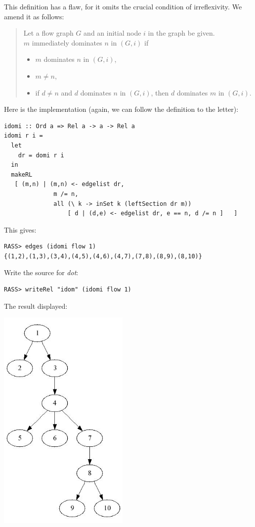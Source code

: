 \documentclass[11pt]{article}
\newlength{\fminilength}
\newenvironment{fminipage}[1][\linewidth]
 {\setlength{\fminilength}{#1-2\fboxsep-2\fboxrule-1em}%
  \bigskip\begin{lrbox}{\fminibox}\quad\begin{minipage}{\fminilength}\bigskip}
 {\smallskip\end{minipage}\end{lrbox}\noindent\fbox{\usebox{\fminibox}}\bigskip}
\newcommand{\bc}{\begin{fminipage}}
\newcommand{\ec}{\end{fminipage}}
\begin{document}
This definition has a flaw, for it omits the crucial condition 
of irreflexivity. We amend it as follows: 

\begin{quote} 
 Let a flow graph $G$ and an initial node $i$ in the graph be given. \\
 $m$ immediately dominates $n$ in $(G,i)$ if 
  \begin{itemize}   
    \item $m$ dominates $n$ in $(G,i)$, 
    \item $m \neq n$, 
    \item if $d \neq n$ and $d$ dominates $n$ in $(G,i)$, 
          then $d$ dominates $m$ in $(G,i)$. 
  \end{itemize} 
\end{quote}

Here is the implementation (again, we can follow the definition to the
letter):

\bc\begin{verbatim}
idomi :: Ord a => Rel a -> a -> Rel a 
idomi r i = 
  let
    dr = domi r i
  in 
  makeRL 
   [ (m,n) | (m,n) <- edgelist dr,
              m /= n, 
              all (\ k -> inSet k (leftSection dr m))
                  [ d | (d,e) <- edgelist dr, e == n, d /= n ]   ]
\end{verbatim}\ec

This gives: 

\begin{verbatim} 
RASS> edges (idomi flow 1)
{(1,2),(1,3),(3,4),(4,5),(4,6),(4,7),(7,8),(8,9),(8,10)}
\end{verbatim}

Write the source for {\em dot}\/: 

\begin{verbatim}
RASS> writeRel "idom" (idomi flow 1)
\end{verbatim} 

The result displayed: 

\begin{center}
\includegraphics[width=2.5in]{idom}
\end{center}
\end{document}
